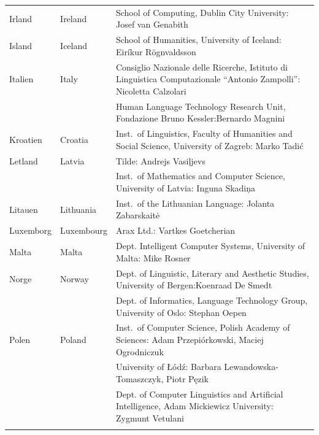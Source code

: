 \begin{longtable}{llp{113mm}}
  Irland & \textcolor{grey1}{Ireland} & School of Computing, Dublin City University: Josef van Genabith\\ \addlinespace
  
  Island & \textcolor{grey1}{Iceland} & School of Humanities, University of Iceland: Eiríkur Rögnvaldsson\\ \addlinespace
  
  Italien & \textcolor{grey1}{Italy} & Consiglio Nazionale delle Ricerche, Istituto di Linguistica Computazionale “Antonio Zampolli”: Nicoletta Calzolari\\ \addlinespace
  & & Human Language Technology Research Unit, Fondazione Bruno Kessler:\newline Bernardo Magnini\\ \addlinespace
  
  Kroatien & \textcolor{grey1}{Croatia} & Inst.~of Linguistics, Faculty of Humanities and Social Science, University of Zagreb: Marko Tadić \\ \addlinespace
  
  Letland & \textcolor{grey1}{Latvia} & Tilde: Andrejs Vasiļjevs\\ \addlinespace 
  & & Inst.~of Mathematics and Computer Science, University of Latvia: Inguna Skadiņa\\ \addlinespace
  
  Litauen & \textcolor{grey1}{Lithuania} & Inst.~of the Lithuanian Language: Jolanta Zabarskaitė\\ \addlinespace
  
  Luxemborg & \textcolor{grey1}{Luxembourg} & Arax Ltd.: Vartkes Goetcherian\\ \addlinespace
  
  Malta & \textcolor{grey1}{Malta} & Dept. Intelligent Computer Systems, University of Malta: Mike Rosner\\ \addlinespace
  
  Norge & \textcolor{grey1}{Norway} & Dept. of Linguistic, Literary and Aesthetic Studies, University of Bergen:\newline Koenraad De Smedt\\ \addlinespace 
  & & Dept. of Informatics, Language Technology Group, University of Oslo: Stephan Oepen \\ \addlinespace
  
  Polen & \textcolor{grey1}{Poland} & Inst.~of Computer Science, Polish Academy of Sciences: \newline Adam Przepiórkowski, Maciej Ogrodniczuk \\ \addlinespace
  & & University of Łódź: Barbara Lewandowska-Tomaszczyk, Piotr Pęzik\\ \addlinespace
  & & Dept. of Computer Linguistics and Artificial Intelligence, Adam Mickiewicz University: Zygmunt Vetulani \\ \addlinespace
  

\end{longtable}
